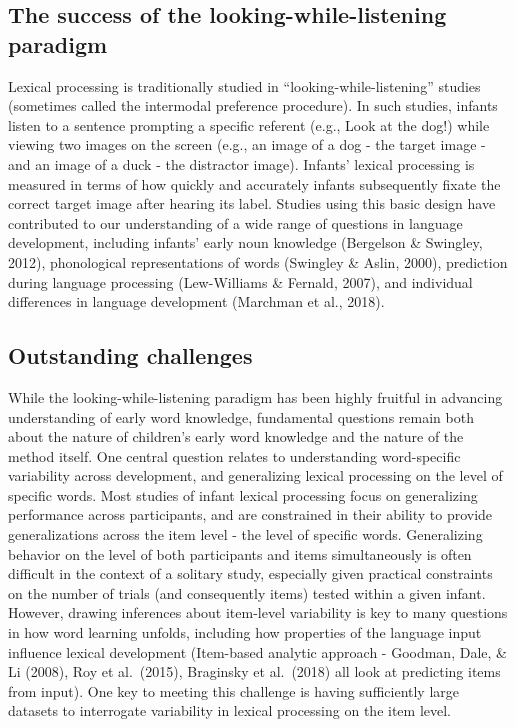 \documentclass[10pt, letterpaper]{article}
\begin{document}
\hypertarget{the-success-of-the-looking-while-listening-paradigm}{%
\subsection{The success of the looking-while-listening
paradigm}\label{the-success-of-the-looking-while-listening-paradigm}}

Lexical processing is traditionally studied in
``looking-while-listening'' studies (sometimes called the intermodal
preference procedure). In such studies, infants listen to a sentence
prompting a specific referent (e.g., Look at the dog!) while viewing two
images on the screen (e.g., an image of a dog - the target image - and
an image of a duck - the distractor image). Infants' lexical processing
is measured in terms of how quickly and accurately infants subsequently
fixate the correct target image after hearing its label. Studies using
this basic design have contributed to our understanding of a wide range
of questions in language development, including infants' early noun
knowledge (Bergelson \& Swingley, 2012), phonological representations of
words (Swingley \& Aslin, 2000), prediction during language processing
(Lew-Williams \& Fernald, 2007), and individual differences in language
development (Marchman et al., 2018).

\hypertarget{outstanding-challenges}{%
\subsection{Outstanding challenges}\label{outstanding-challenges}}

While the looking-while-listening paradigm has been highly fruitful in
advancing understanding of early word knowledge, fundamental questions
remain both about the nature of children's early word knowledge and the
nature of the method itself. One central question relates to
understanding word-specific variability across development, and
generalizing lexical processing on the level of specific words. Most
studies of infant lexical processing focus on generalizing performance
across participants, and are constrained in their ability to provide
generalizations across the item level - the level of specific words.
Generalizing behavior on the level of both participants and items
simultaneously is often difficult in the context of a solitary study,
especially given practical constraints on the number of trials (and
consequently items) tested within a given infant. However, drawing
inferences about item-level variability is key to many questions in how
word learning unfolds, including how properties of the language input
influence lexical development (Item-based analytic approach - Goodman,
Dale, \& Li (2008), Roy et al.~(2015), Braginsky et al.~(2018) all look
at predicting items from input). One key to meeting this challenge is
having sufficiently large datasets to interrogate variability in lexical
processing on the item level.
\end{document}
